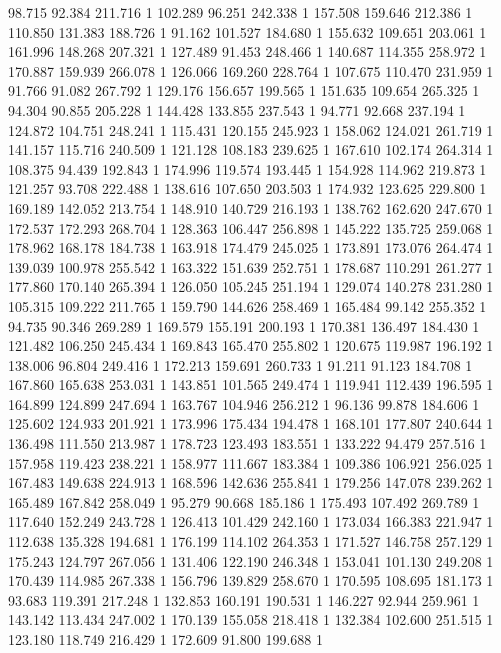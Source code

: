 	98.715	92.384	211.716	1
	102.289	96.251	242.338	1
	157.508	159.646	212.386	1
	110.850	131.383	188.726	1
	91.162	101.527	184.680	1
	155.632	109.651	203.061	1
	161.996	148.268	207.321	1
	127.489	91.453	248.466	1
	140.687	114.355	258.972	1
	170.887	159.939	266.078	1
	126.066	169.260	228.764	1
	107.675	110.470	231.959	1
	91.766	91.082	267.792	1
	129.176	156.657	199.565	1
	151.635	109.654	265.325	1
	94.304	90.855	205.228	1
	144.428	133.855	237.543	1
	94.771	92.668	237.194	1
	124.872	104.751	248.241	1
	115.431	120.155	245.923	1
	158.062	124.021	261.719	1
	141.157	115.716	240.509	1
	121.128	108.183	239.625	1
	167.610	102.174	264.314	1
	108.375	94.439	192.843	1
	174.996	119.574	193.445	1
	154.928	114.962	219.873	1
	121.257	93.708	222.488	1
	138.616	107.650	203.503	1
	174.932	123.625	229.800	1
	169.189	142.052	213.754	1
	148.910	140.729	216.193	1
	138.762	162.620	247.670	1
	172.537	172.293	268.704	1
	128.363	106.447	256.898	1
	145.222	135.725	259.068	1
	178.962	168.178	184.738	1
	163.918	174.479	245.025	1
	173.891	173.076	264.474	1
	139.039	100.978	255.542	1
	163.322	151.639	252.751	1
	178.687	110.291	261.277	1
	177.860	170.140	265.394	1
	126.050	105.245	251.194	1
	129.074	140.278	231.280	1
	105.315	109.222	211.765	1
	159.790	144.626	258.469	1
	165.484	99.142	255.352	1
	94.735	90.346	269.289	1
	169.579	155.191	200.193	1
	170.381	136.497	184.430	1
	121.482	106.250	245.434	1
	169.843	165.470	255.802	1
	120.675	119.987	196.192	1
	138.006	96.804	249.416	1
	172.213	159.691	260.733	1
	91.211	91.123	184.708	1
	167.860	165.638	253.031	1
	143.851	101.565	249.474	1
	119.941	112.439	196.595	1
	164.899	124.899	247.694	1
	163.767	104.946	256.212	1
	96.136	99.878	184.606	1
	125.602	124.933	201.921	1
	173.996	175.434	194.478	1
	168.101	177.807	240.644	1
	136.498	111.550	213.987	1
	178.723	123.493	183.551	1
	133.222	94.479	257.516	1
	157.958	119.423	238.221	1
	158.977	111.667	183.384	1
	109.386	106.921	256.025	1
	167.483	149.638	224.913	1
	168.596	142.636	255.841	1
	179.256	147.078	239.262	1
	165.489	167.842	258.049	1
	95.279	90.668	185.186	1
	175.493	107.492	269.789	1
	117.640	152.249	243.728	1
	126.413	101.429	242.160	1
	173.034	166.383	221.947	1
	112.638	135.328	194.681	1
	176.199	114.102	264.353	1
	171.527	146.758	257.129	1
	175.243	124.797	267.056	1
	131.406	122.190	246.348	1
	153.041	101.130	249.208	1
	170.439	114.985	267.338	1
	156.796	139.829	258.670	1
	170.595	108.695	181.173	1
	93.683	119.391	217.248	1
	132.853	160.191	190.531	1
	146.227	92.944	259.961	1
	143.142	113.434	247.002	1
	170.139	155.058	218.418	1
	132.384	102.600	251.515	1
	123.180	118.749	216.429	1
	172.609	91.800	199.688	1
